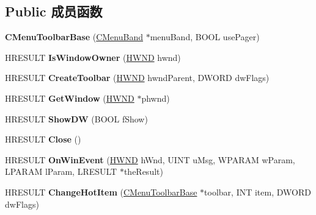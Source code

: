\subsection*{Public 成员函数}
\begin{DoxyCompactItemize}
\item 
\mbox{\label{class_c_menu_toolbar_base_a6384bd6dc458cae72f4985b8b9ef14e5}} 
{\bfseries C\+Menu\+Toolbar\+Base} (\hyperlink{class_c_menu_band}{C\+Menu\+Band} $\ast$menu\+Band, B\+O\+OL use\+Pager)
\item 
\mbox{\label{class_c_menu_toolbar_base_a63f8467f697ae52679243f32b059de68}} 
H\+R\+E\+S\+U\+LT {\bfseries Is\+Window\+Owner} (\hyperlink{interfacevoid}{H\+W\+ND} hwnd)
\item 
\mbox{\label{class_c_menu_toolbar_base_a9a2f940946986b37678ba0d1bce6bd0c}} 
H\+R\+E\+S\+U\+LT {\bfseries Create\+Toolbar} (\hyperlink{interfacevoid}{H\+W\+ND} hwnd\+Parent, D\+W\+O\+RD dw\+Flags)
\item 
\mbox{\label{class_c_menu_toolbar_base_ad61c26f2899863f716c74d6ee2f5e32a}} 
H\+R\+E\+S\+U\+LT {\bfseries Get\+Window} (\hyperlink{interfacevoid}{H\+W\+ND} $\ast$phwnd)
\item 
\mbox{\label{class_c_menu_toolbar_base_a9683c01722a210f9a5a35f815fafb65a}} 
H\+R\+E\+S\+U\+LT {\bfseries Show\+DW} (B\+O\+OL f\+Show)
\item 
\mbox{\label{class_c_menu_toolbar_base_ad309cf6cd43e8d4176c9a663d9c61a59}} 
H\+R\+E\+S\+U\+LT {\bfseries Close} ()
\item 
\mbox{\label{class_c_menu_toolbar_base_a3b76fbadf169b38a87a47764e076dab9}} 
H\+R\+E\+S\+U\+LT {\bfseries On\+Win\+Event} (\hyperlink{interfacevoid}{H\+W\+ND} h\+Wnd, U\+I\+NT u\+Msg, W\+P\+A\+R\+AM w\+Param, L\+P\+A\+R\+AM l\+Param, L\+R\+E\+S\+U\+LT $\ast$the\+Result)
\item 
\mbox{\label{class_c_menu_toolbar_base_ac3424b37c4abec7e1a81bff4350d1420}} 
H\+R\+E\+S\+U\+LT {\bfseries Change\+Hot\+Item} (\hyperlink{class_c_menu_toolbar_base}{C\+Menu\+Toolbar\+Base} $\ast$toolbar, I\+NT item, D\+W\+O\+RD dw\+Flags)

\end{DoxyCompactItemize}

